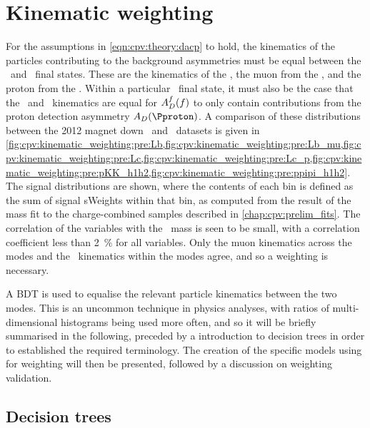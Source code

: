\chapter{Kinematic weighting}
\label{chap:cpv:kinematic_weighting}

For the assumptions in \cref{eqn:cpv:theory:dacp} to hold, the
kinematics of the particles contributing to the background asymmetries must be 
equal between the \pKK\ and \ppipi\ final states.
These are the kinematics of the \PLambdab, the muon from the \PLambdab, and the 
proton from the \PLambdac.
Within a particular \phh\ final state, it must also be the case that the \Php\ 
and \Phm\ kinematics are equal for $A_{D}^{f}(f)$ to only contain contributions from 
the proton detection asymmetry $\AD(\Pproton)$.
A comparison of these distributions between the 2012 magnet down \pKK\ and 
\ppipi\ datasets is given in 
\cref{fig:cpv:kinematic_weighting:pre:Lb,fig:cpv:kinematic_weighting:pre:Lb_mu,fig:cpv:kinematic_weighting:pre:Lc,fig:cpv:kinematic_weighting:pre:Lc_p,fig:cpv:kinematic_weighting:pre:pKK_h1h2,fig:cpv:kinematic_weighting:pre:ppipi_h1h2}.
The signal distributions are shown, where the contents of each bin is defined 
as the sum of signal sWeights within that bin, as computed from the result of 
the mass fit to the charge-combined samples described in 
\cref{chap:cpv:prelim_fits}.
The correlation of the variables with the \PLambdac\ mass is seen to be small, 
with a correlation coefficient less than \SI{2}{\percent} for all variables.
Only the muon kinematics across the modes and the \hmhp\ kinematics within the 
modes agree, and so a weighting is necessary.

A \acf{BDT} is used to equalise the relevant particle kinematics between the 
two modes.
This is an uncommon technique in physics analyses, with ratios of 
multi-dimensional histograms being used more often, and so it will be briefly 
summarised in the following, preceded by a introduction to decision trees in 
order to established the required terminology.
The creation of the specific models using for weighting will then be presented, 
followed by a discussion on weighting validation.

\section{Decision trees}
\label{chap:cpv:kinematic_weighting:bdt_theory}

